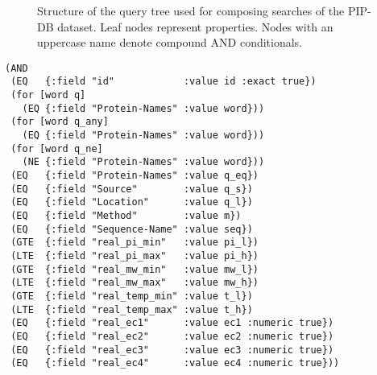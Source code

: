 \begin{figure}[t]
\centering
{}
\caption[Structure of the query tree for composing searches]
        {Structure of the query tree used for composing searches of
          the PIP-DB dataset. Leaf nodes represent properties. Nodes
          with an uppercase name denote compound AND conditionals.}
\label{fig:query-tree}
\end{figure}


\lstset{language=Clojure}
\begin{lstlisting}[label=lst:query-tree,caption={
      [Clojure implementation of the query tree]
      Implementation of the query tree in Clojure, from the file
      \texttt{query.clj}. Note the flat query hierarchy and the
      use of the \texttt{for} macro for expanding multivalued
      queries.}]
(AND
 (EQ   {:field "id"            :value id :exact true})
 (for [word q]
   (EQ {:field "Protein-Names" :value word}))
 (for [word q_any]
   (EQ {:field "Protein-Names" :value word}))
 (for [word q_ne]
   (NE {:field "Protein-Names" :value word}))
 (EQ   {:field "Protein-Names" :value q_eq})
 (EQ   {:field "Source"        :value q_s})
 (EQ   {:field "Location"      :value q_l})
 (EQ   {:field "Method"        :value m})
 (EQ   {:field "Sequence-Name" :value seq})
 (GTE  {:field "real_pi_min"   :value pi_l})
 (LTE  {:field "real_pi_max"   :value pi_h})
 (GTE  {:field "real_mw_min"   :value mw_l})
 (LTE  {:field "real_mw_max"   :value mw_h})
 (GTE  {:field "real_temp_min" :value t_l})
 (LTE  {:field "real_temp_max" :value t_h})
 (EQ   {:field "real_ec1"      :value ec1 :numeric true})
 (EQ   {:field "real_ec2"      :value ec2 :numeric true})
 (EQ   {:field "real_ec3"      :value ec3 :numeric true})
 (EQ   {:field "real_ec4"      :value ec4 :numeric true}))
\end{lstlisting}


